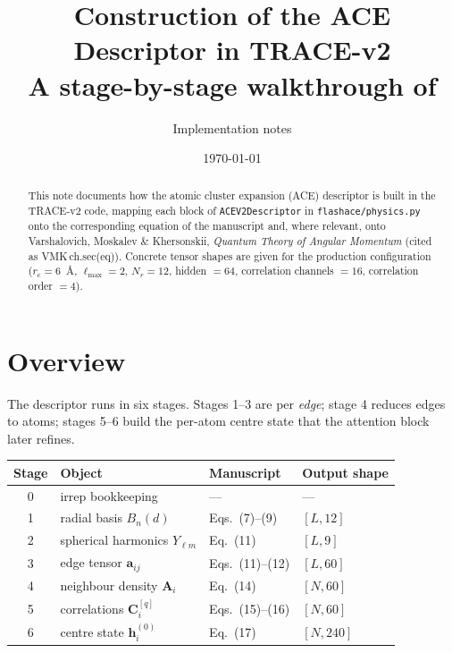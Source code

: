 \documentclass[11pt,a4paper]{article}
\title{\vspace{-1.3cm}\textbf{Construction of the ACE Descriptor in TRACE-v2}\\[3pt]
\large A stage-by-stage walkthrough of \code{flashace/physics.py}}
\author{Implementation notes}
\date{\today}
\newcommand{\code}[1]{\texttt{\small #1}}
\begin{document}
\maketitle
\vspace{-0.5cm}

\begin{abstract}
\noindent
This note documents how the atomic cluster expansion (ACE) descriptor is built in
the TRACE-v2 code, mapping each block of \code{ACEV2Descriptor} in
\code{flashace/physics.py} onto the corresponding equation of the manuscript and,
where relevant, onto Varshalovich, Moskalev \& Khersonskii, \emph{Quantum Theory of
Angular Momentum} (cited as VMK\,ch.sec(eq)). Concrete tensor shapes are given for
the production configuration
($r_{\mathrm c}=6$~\AA, $\ell_{\max}=2$, $N_r=12$, hidden $=64$,
correlation channels $=16$, correlation order $=4$).
\end{abstract}

\section{Overview}

The descriptor runs in six stages. Stages 1--3 are per \emph{edge}; stage 4
reduces edges to atoms; stages 5--6 build the per-atom centre state that the
attention block later refines.

\begin{center}\small
\begin{tabular}{@{}clll@{}}
\toprule
Stage & Object & Manuscript & Output shape \\
\midrule
0 & irrep bookkeeping            & ---            & --- \\
1 & radial basis $B_n(d)$        & Eqs.~(7)--(9)  & $[L,12]$ \\
2 & spherical harmonics $Y_{\ell m}$ & Eq.~(11)   & $[L,9]$ \\
3 & edge tensor $\bm a_{ij}$     & Eqs.~(11)--(12)& $[L,60]$ \\
4 & neighbour density $\bm A_i$  & Eq.~(14)       & $[N,60]$ \\
5 & correlations $\bm C^{[q]}_i$ & Eqs.~(15)--(16)& $[N,60]$ \\
6 & centre state $\bm h^{(0)}_i$ & Eq.~(17)       & $[N,240]$ \\
\bottomrule
\end{tabular}
\end{center}
\end{document}

